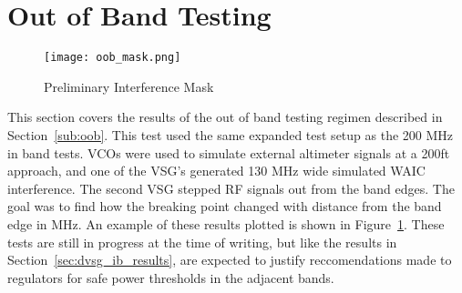 \section{Out of Band Testing}\label{sec:dvsg_oob_results}
 \begin{figure}[h!]
	\centering
	\texttt{[image: oob\_mask.png]}
	\caption{Preliminary Interference Mask}
	\label{fig:oob_mask}
\end{figure}

This section covers the results of the out of band testing regimen described in Section~\ref{sub:oob}. This test used the same expanded test setup as the 200 MHz in band tests. VCOs were used to simulate external altimeter signals at a 200ft approach, and one of the VSG's generated 130 MHz wide simulated WAIC interference. The second VSG stepped RF signals out from the band edges. The goal was to find how the breaking point changed with distance from the band edge in MHz. An example of these results plotted is shown in Figure~\ref{fig:oob_mask}. These tests are still in progress at the time of writing, but like the results in Section~\ref{sec:dvsg_ib_results}, are expected to justify reccomendations made to regulators for safe power thresholds in the adjacent bands. 

